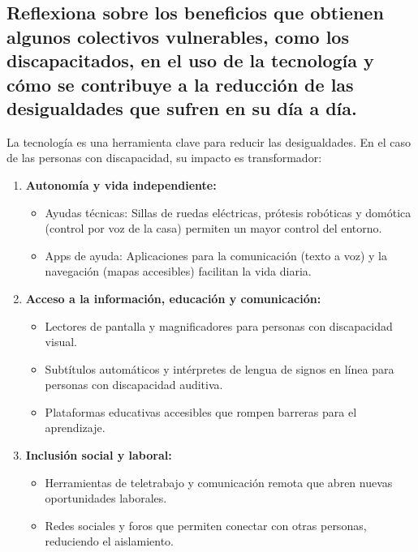 
\fsection{\boldit{\textcolor{waveBlue2}{Actividad.}}} 
\subsection*{Reflexiona sobre los beneficios que obtienen algunos colectivos vulnerables, como los discapacitados, en el uso de la tecnología y cómo se contribuye a la reducción de las desigualdades que sufren en su día a día.}

\begin{solution}
La tecnología es una herramienta clave para reducir las desigualdades. En el caso de las personas con discapacidad, su impacto es transformador:
\begin{enumerate}
	\item \textbf{Autonomía y vida independiente:}
		\begin{itemize}
			\item{Ayudas técnicas: Sillas de ruedas eléctricas, prótesis robóticas y domótica (control por voz de la casa) permiten un mayor control del entorno.}
			\item{Apps de ayuda: Aplicaciones para la comunicación (texto a voz) y la navegación (mapas accesibles) facilitan la vida diaria.}
		\end{itemize}
	\item \textbf{Acceso a la información, educación y comunicación:
}
		\begin{itemize}
			\item{Lectores de pantalla y magnificadores para personas con discapacidad visual.}
			\item{Subtítulos automáticos y intérpretes de lengua de signos en línea para personas con discapacidad auditiva.}
			\item{Plataformas educativas accesibles que rompen barreras para el aprendizaje.}
		\end{itemize}

	\item \textbf{Inclusión social y laboral:}
		\begin{itemize}
			\item{Herramientas de teletrabajo y comunicación remota que abren nuevas oportunidades laborales.}
			\item{Redes sociales y foros que permiten conectar con otras personas, reduciendo el aislamiento.}
		\end{itemize}

\end{enumerate}


\end{solution}
